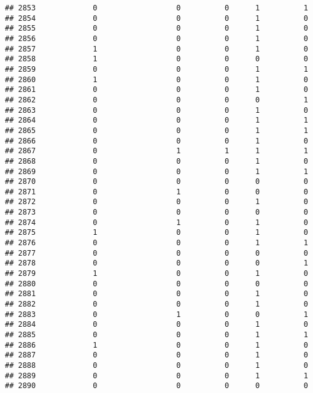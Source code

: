 \documentclass[
]{article}
\begin{document}
\begin{verbatim}
## 2853             0                  0          0      1          1
## 2854             0                  0          0      1          0
## 2855             0                  0          0      1          0
## 2856             0                  0          0      1          0
## 2857             1                  0          0      1          0
## 2858             1                  0          0      0          0
## 2859             0                  0          0      1          1
## 2860             1                  0          0      1          0
## 2861             0                  0          0      1          0
## 2862             0                  0          0      0          1
## 2863             0                  0          0      1          0
## 2864             0                  0          0      1          1
## 2865             0                  0          0      1          1
## 2866             0                  0          0      1          0
## 2867             0                  1          1      1          1
## 2868             0                  0          0      1          0
## 2869             0                  0          0      1          1
## 2870             0                  0          0      0          0
## 2871             0                  1          0      0          0
## 2872             0                  0          0      1          0
## 2873             0                  0          0      0          0
## 2874             0                  1          0      1          0
## 2875             1                  0          0      1          0
## 2876             0                  0          0      1          1
## 2877             0                  0          0      0          0
## 2878             0                  0          0      0          1
## 2879             1                  0          0      1          0
## 2880             0                  0          0      0          0
## 2881             0                  0          0      1          0
## 2882             0                  0          0      1          0
## 2883             0                  1          0      0          1
## 2884             0                  0          0      1          0
## 2885             0                  0          0      1          1
## 2886             1                  0          0      1          0
## 2887             0                  0          0      1          0
## 2888             0                  0          0      1          0
## 2889             0                  0          0      1          1
## 2890             0                  0          0      0          0

\end{verbatim}
\end{document}
